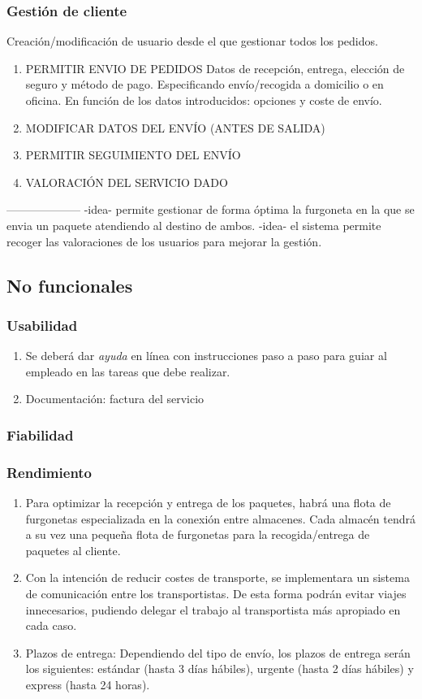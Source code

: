 \subsubsection{Gestión de cliente}
Creación/modificación de usuario desde el que gestionar todos los pedidos.

\begin{enumerate}
	\item PERMITIR ENVIO DE PEDIDOS
	\subitem Datos de recepción, entrega, elección de seguro y método de pago. Especificando envío/recogida a domicilio o en oficina.
	\subitem En función de los datos introducidos: opciones y coste de envío.
	\item MODIFICAR DATOS DEL ENVÍO (ANTES DE SALIDA) 
	\item PERMITIR SEGUIMIENTO DEL ENVÍO
	\item VALORACIÓN DEL SERVICIO DADO
\end{enumerate}



--------------------
-idea- permite gestionar de forma óptima la furgoneta en la que se envia un paquete atendiendo al destino de ambos.
-idea- el sistema permite recoger las valoraciones de los usuarios para mejorar la gestión.
\newpage
\subsection{No funcionales}
\subsubsection{Usabilidad}
\begin{enumerate}
	\item Se deberá dar \textit{ayuda} en línea con instrucciones paso a paso para guiar al empleado en las tareas que debe realizar.
	\item Documentación: factura del servicio
\end{enumerate}
\subsubsection{Fiabilidad}

\subsubsection{Rendimiento}
\begin{enumerate}
	\item Para optimizar la recepción y entrega de los paquetes, habrá una flota de furgonetas especializada en la conexión entre almacenes. Cada almacén tendrá a su vez una pequeña flota de furgonetas para la recogida/entrega de paquetes al cliente.
	\item Con la intención de reducir costes de transporte, se implementara un sistema de comunicación entre los transportistas. De esta forma podrán evitar viajes innecesarios, pudiendo delegar el trabajo al transportista más apropiado en cada caso.
	\item Plazos de entrega: Dependiendo del tipo de envío, los plazos de entrega serán los siguientes: estándar (hasta 3 días hábiles), urgente (hasta 2 días hábiles) y express (hasta 24 horas).
\end{enumerate}

